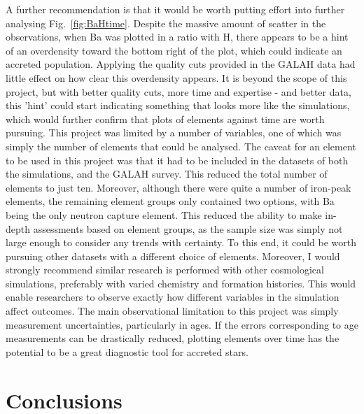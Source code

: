 \documentclass[fleqn,usenatbib]{mnras}
\begin{document}
A further recommendation is that it would be worth putting effort into further analysing Fig.~\ref{fig:BaHtime}. Despite the massive amount of scatter in the observations, when Ba was plotted in a ratio with H, there appears to be a hint of an overdensity toward the bottom right of the plot, which could indicate an accreted population. Applying the quality cuts provided in the GALAH data had little effect on how clear this overdensity appears. It is beyond the scope of this project, but with better quality cuts, more time and expertise - and better data, this 'hint' could start indicating something that looks more like the simulations, which would further confirm that plots of elements against time are worth pursuing.  
This project was limited by a number of variables, one of which was simply the number of elements that could be analysed. The caveat for an element to be used in this project was that it had to be included in the datasets of both the simulations, and the GALAH survey. This reduced the total number of elements to just ten. Moreover, although there were quite a number of iron-peak elements, the remaining element groups only contained two options, with Ba being the only neutron capture element. This reduced the ability to make in-depth assessments based on element groups, as the sample size was simply not large enough to consider any trends with certainty. To this end, it could be worth pursuing other datasets with a different choice of elements.  
Moreover, I would strongly recommend similar research is performed with other cosmological simulations, preferably with varied chemistry and formation histories. This would enable researchers to observe exactly how different variables in the simulation affect outcomes. 
The main observational limitation to this project was simply measurement uncertainties, particularly in ages. If the errors corresponding to age measurements can be drastically reduced, plotting elements over time has the potential to be a great diagnostic tool for accreted stars. 



\section{Conclusions}
\label{sec:conc}
\end{document}
